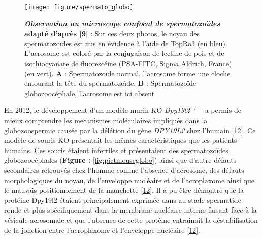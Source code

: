 \documentclass[12pt,twoside]{ugathesis}
\begin{document}
\begin{figure}

{\centering \texttt{[image: figure/spermato\_globo]} 

}

\caption[Observation au microscope confocal de spermatozoïdes]{\textbf{\emph{Observation au microscope confocal de
spermatozoïdes} adapté d'après
{[}\protect\hyperlink{ref-Harbuz2011}{9}{]}} : Sur ces deux photos, le
noyau des spermatozoïdes est mis en évidence à l'aide de TopRo3 (en
bleu). L'acrosome est coloré par la conjugaison de lectine de pois et de
isothiocyanate de fluorescéine (PSA-FITC, Sigma Aldrich, France) (en
vert). \textbf{A} : Spermatozoïde normal, l'acrosome forme une cloche
entourant la tête du spermatozoïde. \textbf{B} : Spermatozoïde
globozoocéphale, l'acrosome est ici absent}\label{fig:pictglobospz}
\end{figure}











En 2012, le développement d'un modèle murin KO \emph{Dpy19l2}\(^{-/-}\)
a permis de mieux comprendre les mécanismes moléculaires impliqués dans
la globozoospermie causée par la délétion du gène \emph{DPY19L2} chez
l'humain {[}\protect\hyperlink{ref-Pierre2012}{12}{]}. Ce modèle de
souris KO présentait les mêmes caractéristiques que les patients
humains. Ces souris étaient infertiles et présentaient des
spermatozoïdes globozoocéphales (\textbf{Figure :
}\ref{fig:pictmouseglobo}) ainsi que d'autre défauts secondaires
retrouvés chez l'homme comme l'absence d'acrosome, des défauts
morphologiques du noyau, de l'enveloppe nucléaire et de l'acroplaxome
ainsi que le mauvais positionnement de la manchette
{[}\protect\hyperlink{ref-Pierre2012}{12}{]}. Il a pu être démontré que
la protéine Dpy19l2 étaient principalement exprimée dans au stade
spermatide ronde et plus spécifiquement dans la membrane nucléaire
interne faisant face à la vésicule acrosomale et que l'absence de cette
protéine entrainait la déstabilisation de la jonction entre
l'acroplaxome et l'enveloppe nucléaire
{[}\protect\hyperlink{ref-Pierre2012}{12}{]}.

\newpage 
\end{document}
